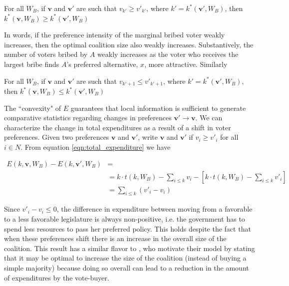 \begin{proposition}
    For all $W_B$, if $\mathbf{v}$ and $\mathbf{v}'$ are such that $v_{k'} \geq v'_{k'}$, where $k' = k^*(\mathbf{v}', W_B)$, then $k^*(\mathbf{v}, W_B) \geq k^*(\mathbf{v}', W_B)$
\end{proposition}

In words, if the preference intensity of the marginal bribed voter weakly increases, then the optimal coalition size also weakly increases. Substantively, the number of voters bribed by $A$ weakly increases as the voter who receives the largest bribe finds $A$'s preferred alternative, $x$, more attractive. Similarly

\begin{proposition}
    For all $W_B$, if $\mathbf{v}$ and $\mathbf{v}'$ are such that $v_{k' + 1} \leq v'_{k' + 1}$, where $k' = k^*(\mathbf{v}', W_B)$, then $k^*(\mathbf{v}, W_B) \leq k^*(\mathbf{v}', W_B)$
\end{proposition}

The ``convexity" of $E$ guarantees that local information is sufficient to generate comparative statistics regarding changes in preferences $\mathbf{v}' \rightarrow \mathbf{v}$. We can characterize the change in total expenditures as a result of a shift in voter preferences. Given two preferences $\mathbf{v}$ and $\mathbf{v}'$, write $\mathbf{v}$ and $\mathbf{v}'$ if $v_i \geq v'_i$ for all $i \in N$. From equation \ref{eqn:total_expenditure} we have

\begin{align*}
    E(k, \mathbf{v}, W_B) - E(k, \mathbf{v}', W_B) & = \\
    &= k \cdot t(k, W_B) - \sum_{i \leq k} v_i - \left[k \cdot t(k, W_B) - \sum_{i \leq k} v'_i\right]\\
    &= \sum_{i \leq k}(v'_i - v_i)
\end{align*}

Since $v'_i - v_i \leq 0$, the difference in expenditure between moving from a favorable to a less favorable legislature is always non-positive, i.e. the government has to spend less resources to pass her preferred policy. This holds despite the fact that when these preferences shift there is an increase in the overall size of the coalition. This result has a similar flavor to \citet{groseclose_1996_buying}, who motivate their model by stating that it may be optimal to increase the size of the coalition (instead of buying a simple majority) because doing so overall can lead to a reduction in the amount of expenditures by the vote-buyer.

